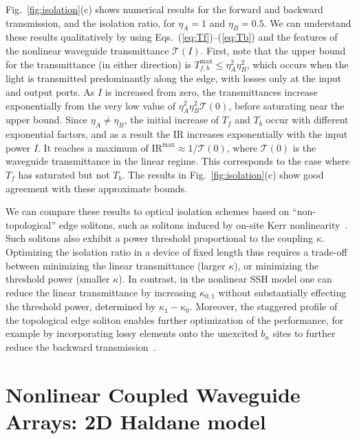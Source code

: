 \documentclass[aps,prx,twocolumn,superscriptaddress]{revtex4-1}
\begin{document}
Fig.~\ref{fig:isolation}(c) shows numerical results for the forward and backward transmission, and the isolation ratio, for $\eta_A = 1$ and $\eta_B = 0.5$.  We can understand these results qualitatively by using Eqs.~(\ref{eq:Tf})--(\ref{eq:Tb}) and the features of the nonlinear waveguide transmittance $\mathcal{T}(I)$.  First, note that the upper bound for the transmittance (in either direction) is $T_{f,b}^{\mathrm{max}} \le \eta_A^2\eta_B^2$, which occurs when the light is transmitted predominantly along the edge, with losses only at the input and output ports.  As $I$ is increased from zero, the transmittances increase exponentially from the very low value of $\eta_A^2\eta_B^2\mathcal{T}(0)$, before saturating near the upper bound.  Since $\eta_A \ne \eta_B$, the initial increase of $T_f$ and $T_b$ occur with different exponential factors, and as a result the IR increases exponentially with the input power $I$.  It reaches a maximum of $\mathrm{IR}^{\mathrm{max}} \approx 1/\mathcal{T}(0)$, where $\mathcal{T}(0)$ is the waveguide transmittance in the linear regime.  This corresponds to the case where $T_f$ has saturated but not $T_b$.  The results in Fig.~\ref{fig:isolation}(c) show good agreement with these approximate bounds.

We can compare these results to optical isolation schemes based on ``non-topological'' edge solitons, such as solitons induced by on-site Kerr nonlinearity~\cite{Makris2005,Suntsov2006,Suntsov2007}.  Such solitons also exhibit a power threshold proportional to the coupling $\kappa$. Optimizing the isolation ratio in a device of fixed length thus requires a trade-off between minimizing the linear transmittance (larger $\kappa$), or minimizing the threshold power (smaller $\kappa$). In contrast, in the nonlinear SSH model one can reduce the linear transmittance by increasing $\kappa_{0,1}$ without substantially effecting the threshold power, determined by $\kappa_1-\kappa_0$. Moreover, the staggered profile of the topological edge soliton enables further optimization of the performance, for example by incorporating lossy elements onto the unexcited $b_n$ sites to further reduce the backward transmission~\cite{el2015ol}.

\section{Nonlinear Coupled Waveguide Arrays: 2D Haldane model}
\label{sec:array2d}
\end{document}
